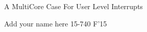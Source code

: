 \documentclass[11pt]{article}
\begin{document}
\vspace*{-5ex}\centerline{\Large A MultiCore Case For User Level Interrupts}
\vspace*{-.5ex}
\begin{center}
Add your name here
15-740 F'15
\end{center}





\vspace*{6ex}
\vspace*{3ex}


 

\end{document}
